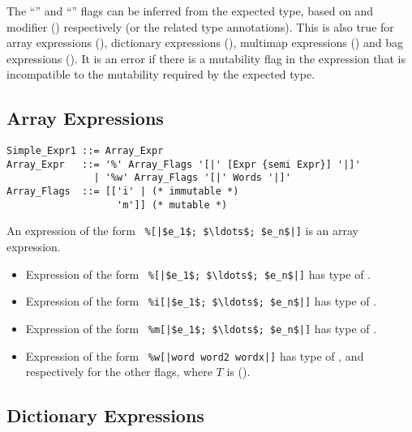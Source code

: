 The ``'' and ``'' flags can be inferred from the expected type, based on  and  modifier () respectively (or the related type annotations). This is also true for array expressions (), dictionary expressions (), multimap expressions () and bag expressions (). It is an error if there is a mutability flag in the expression that is incompatible to the mutability required by the expected type. 





\subsection{Array Expressions}
\label{sec:array-expressions}

\syntax\begin{lstlisting}
Simple_Expr1 ::= Array_Expr
Array_Expr   ::= '%' Array_Flags '[|' [Expr {semi Expr}] '|]'
               | '%w' Array_Flags '[|' Words '|]'
Array_Flags  ::= [['i' | (* immutable *)
                   'm']] (* mutable *)
\end{lstlisting}

An expression of the form ~\lstinline!%[|$e_1$; $\ldots$; $e_n$|]! is an array expression. 

\begin{itemize}
  \item Expression of the form ~\lstinline!%[|$e_1$; $\ldots$; $e_n$|]!
    has type of . 
  \item Expression of the form ~\lstinline!%i[|$e_1$; $\ldots$; $e_n$|]!
    has type of . 
  \item Expression of the form ~\lstinline!%m[|$e_1$; $\ldots$; $e_n$|]!
    has type of .
  \item Expression of the form ~\lstinline!%w[|word word2 wordx|]!
    has type of , and respectively for the other flags, where $T$ is  (). 
\end{itemize}






\subsection{Dictionary Expressions}
\label{sec:dict-expressions}

